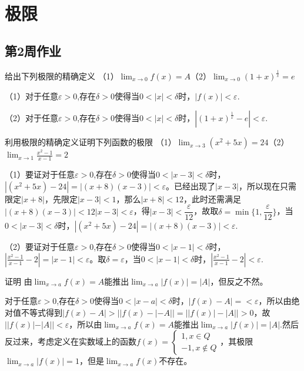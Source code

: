 \chapter{极限}
\newpage
\section{第2周作业}
\begin{example}{给出下列极限的精确定义}{}
    （1）$\displaystyle\lim_{x\to 0}f(x)=A$\quad （2）$\displaystyle\lim_{x\to 0}(1+x)^{\frac{1}{x}}=e$
\end{example}
\begin{solution}
    （1）对于任意$\varepsilon >0$,存在$\delta>0$使得当$0<|x|<\delta$时，$|f(x)|<\varepsilon$.

    （2）对于任意$\varepsilon>0$,存在$\delta>0$使得当$0<|x|<\delta$时，$|(1+x)^{\frac{1}{x}}-e|<\varepsilon$.
\end{solution}
\begin{example}{利用极限的精确定义证明下列函数的极限}{}
    （1）$\displaystyle\lim_{x\to 3}(x^2+5x)=24$\quad （2）$\displaystyle\lim_{x\to 1}\frac{x^2-1}{x-1}=2$
\end{example}
\begin{solution}
    （1）要证对于任意$\varepsilon>0$,存在$\delta>0$使得当$0<|x-3|<\delta$时，$|(x^2+5x)-24|=|(x+8)(x-3)|<\varepsilon$。已经出现了$|x-3|$，所以现在只需限定$|x+8|$，先限定$|x-3|<1$，那么$|x+8|<12$，此时还需满足$|(x+8)(x-3)|<12|x-3|<\varepsilon$，得$|x-3|<\dfrac{\varepsilon}{12}$，故取$\delta=\min\{1,\dfrac{\varepsilon}{12}\}$，当$0<|x-3|<\delta$时，$|(x^2+5x)-24|=|(x+8)(x-3)|<\varepsilon$.

    （2）要证对于任意$\varepsilon>0$,存在$\delta>0$使得当$0<|x-1|<\delta$时，$|\frac{x^2-1}{x-1}-2|=|x-1|<\varepsilon$。取$\delta=\varepsilon$，当$0<|x-1|<\delta$时，$|\frac{x^2-1}{x-1}-2|<\varepsilon$.
\end{solution}
\begin{example}{证明}{}
    由$\displaystyle\lim_{x\to a}f(x)=A$能推出$\displaystyle\lim_{x\to a}|f(x)|=|A|$，但反之不然。
\end{example}
\begin{solution}
    对于任意$\varepsilon>0$,存在$\delta>0$使得当$0<|x-a|<\delta$时，$|f(x)-A|=<\varepsilon$，所以由绝对值不等式得到$\displaystyle|f(x)-A|>||f(x)-|-A||=||f(x)|-|A||>0$，故$||f(x)|-|A||<\varepsilon$，所以由$\displaystyle\lim_{x\to a}f(x)=A$能推出$\displaystyle\lim_{x\to a}|f(x)|=|A|$.然后反过来，考虑定义在实数域上的函数$f(x)=\begin{cases}1,x\in Q\\-1,x\notin Q\end{cases}$，其极限$\displaystyle\lim_{x\to a}|f(x)|=1$，但是$\displaystyle\lim_{x\to a}f(x)$不存在。
\end{solution}
